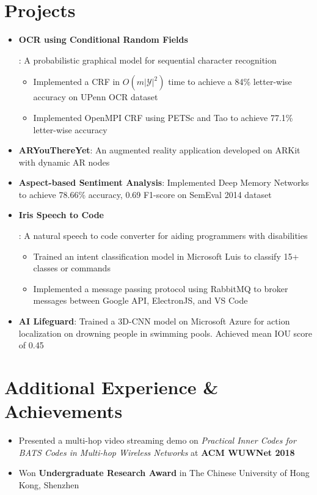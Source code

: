 \documentclass[letterpaper,10pt]{article}
\newcommand{\resumeItem}[2]{
	\item\small{
		\textbf{#1}{: #2 \vspace{-2pt}}
	}
}
\newcommand{\resumeSubItem}[2]{\resumeItem{#1}{#2}\vspace{-4pt}}
\newcommand{\resumeSubHeadingListStart}{\begin{itemize}[leftmargin=*]}
\newcommand{\resumeSubHeadingListEnd}{\end{itemize}}
\newcommand{\shorterSection}[1]{\vspace{-10pt}\section{#1}}
\begin{document}
	\shorterSection{Projects}
	\resumeSubHeadingListStart
	\resumeSubItem{OCR using Conditional Random Fields}
	{A probabilistic graphical model for sequential character recognition
		\vspace{-5pt}
		\begin{itemize}
			\item Implemented a CRF in $O(m|\mathcal{Y}|^2)$ time to achieve a 84\% letter-wise accuracy on UPenn OCR dataset
			\item Implemented OpenMPI CRF using PETSc and Tao to achieve 77.1\% letter-wise accuracy
		\end{itemize}
	}
	\resumeSubItem{ARYouThereYet}{An augmented reality application developed on ARKit with dynamic AR nodes}
	\resumeSubItem{Aspect-based Sentiment Analysis}
	{Implemented Deep Memory Networks to achieve 78.66\% accuracy, 0.69 F1-score on SemEval 2014 dataset}
	\resumeSubItem{Iris Speech to Code}
	{A natural speech to code converter for aiding programmers with disabilities
		\vspace{-5pt}
		\begin{itemize}
			\item Trained an intent classification model in Microsoft Luis to classify 15+ classes or commands
			\item Implemented a message passing protocol using RabbitMQ to broker messages between Google API, ElectronJS, and VS Code
		\end{itemize}
	}
	\resumeSubItem{AI Lifeguard}{Trained a 3D-CNN model on Microsoft Azure for action localization on drowning people in swimming pools. Achieved mean IOU score of 0.45}
	\resumeSubHeadingListEnd
	
	\shorterSection{Additional Experience \& Achievements}
	\resumeSubHeadingListStart
	\small
	\item{Presented a {multi-hop video streaming demo} on \textit{Practical Inner Codes for BATS Codes in Multi-hop Wireless Networks} at \textbf{ACM WUWNet 2018}}
	\vspace{-5pt}
	\item{Won \textbf{Undergraduate Research Award} in The Chinese University of Hong Kong, Shenzhen}
	
	\resumeSubHeadingListEnd
\end{document}
